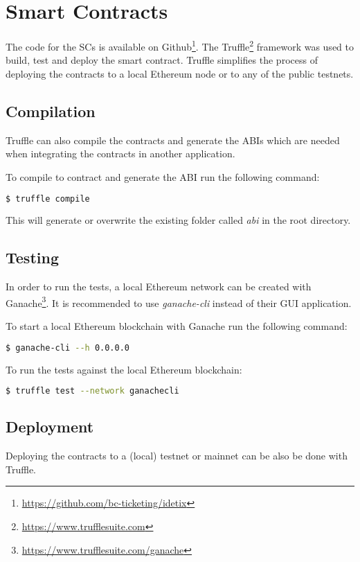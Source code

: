 \section{Smart Contracts}
The code for the SCs is available on Github\footnote{\url{https://github.com/bc-ticketing/idetix}}. The Truffle\footnote{\url{https://www.trufflesuite.com}} framework was used to build, test and deploy the smart contract. Truffle simplifies the process of deploying the contracts to a local Ethereum node or to any of the public testnets.

\subsection{Compilation}
Truffle can also compile the contracts and generate the ABIs which are needed when integrating the contracts in another application.

\noindent To compile to contract and generate the ABI run the following command:
\begin{lstlisting}[language=bash]
  $ truffle compile
\end{lstlisting}

This will generate or overwrite the existing folder called \textit{abi} in the root directory. 

\subsection{Testing}

In order to run the tests, a local Ethereum network can be created with Ganache\footnote{\url{https://www.trufflesuite.com/ganache}}. It is recommended to use \textit{ganache-cli} instead of their GUI application.

\noindent To start a local Ethereum blockchain with Ganache run the following command:
\begin{lstlisting}[language=bash]
  $ ganache-cli --h 0.0.0.0
\end{lstlisting}

\noindent To run the tests against the local Ethereum blockchain:
\begin{lstlisting}[language=bash]
  $ truffle test --network ganachecli
\end{lstlisting}

\subsection{Deployment}
Deploying the contracts to a (local) testnet or mainnet can be also be done with Truffle. 


